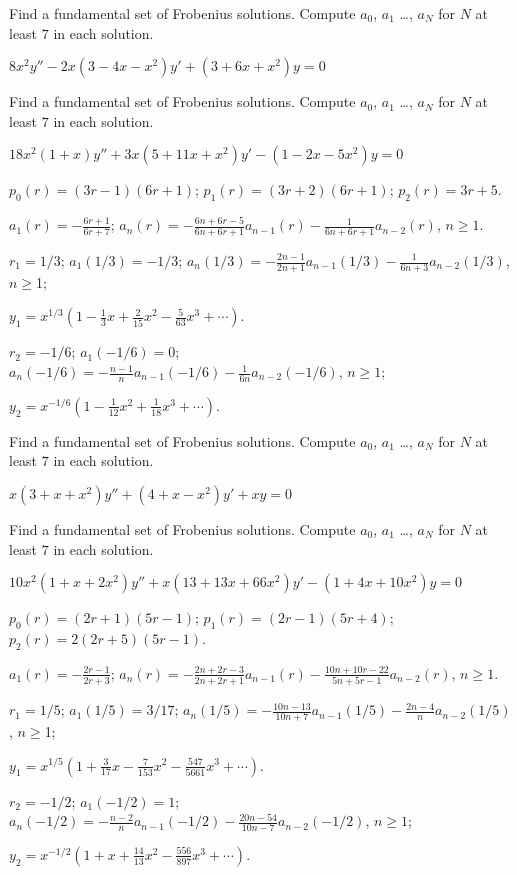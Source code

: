 \documentclass{ximera}
\begin{document}
\begin{problem}\label{exer:7.5.7} 
Find a fundamental
set
of Frobenius solutions. Compute $a_0$, $a_{1}$ \dots, $a_N$ for $N$ at
least
$7$ in
each solution.

$8x^2y''-2x(3-4x-x^2)y'+(3+6x+x^2)y=0$

\end{problem}

\begin{problem}\label{exer:7.5.8} 
Find a fundamental
set
of Frobenius solutions. Compute $a_0$, $a_{1}$ \dots, $a_N$ for $N$ at
least
$7$ in
each solution.

$18x^2(1+x)y''+3x(5+11x+x^2)y'-(1-2x-5x^2)y=0$

\begin{solution}
    $p_0(r)=(3r-1)(6r+1)$;
$p_1(r)=(3r+2)(6r+1)$;
$p_2(r)=3r+5$.

$a_1(r)=-\frac{6r+1}{6r+7}$;
$a_n(r)=-\frac{6n+6r-5}{6n+6r+1}a_{n-1}(r)-\frac{1}{6n+6r+1}a_{n-2}(r)$,
$n\geq 1$.

$r_1=1/3$;
$a_1(1/3)=-1/3$;
$a_n(1/3)=-\frac{2n-1}{2n+1}a_{n-1}(1/3)-\frac{1}{6n+3}a_{n-2}(1/3)$,
$n\geq $1;

$y_1=x^{1/3}\left(1-\frac{1}{3}x+\frac{2}{15}x^2-
\frac{5}{63}x^3+\cdots\right)$.


$r_2=-1/6$;
$a_1(-1/6)=0$;
$a_n(-1/6)=-\frac{n-1}{ n}a_{n-1}(-1/6)-\frac{1}{6n}a_{n-2}(-1/6)$,
$n\geq 1$;

$y_2=x^{-1/6}\left(1-\frac{1}{12}x^2+\frac{1}{18}x^3+\cdots\right)$.
\end{solution}
\end{problem}

\begin{problem}\label{exer:7.5.9}
Find a fundamental
set
of Frobenius solutions. Compute $a_0$, $a_{1}$ \dots, $a_N$ for $N$ at
least
$7$ in
each solution.

$x(3+x+x^2)y''+(4+x-x^2)y'+xy=0$
\end{problem}

\begin{problem}\label{exer:7.5.10} 
Find a fundamental
set
of Frobenius solutions. Compute $a_0$, $a_{1}$ \dots, $a_N$ for $N$ at
least
$7$ in
each solution.

$10x^2(1+x+2x^2)y''+x(13+13x+66x^2)y'-(1+4x+10x^2)y=0$

\begin{solution}
    $p_0(r)=(2r+1)(5r-1)$;
$p_1(r)=(2r-1)(5r+4)$;
$p_2(r)=2(2r+5)(5r-1)$.

$a_1(r)=-\frac{2r-1}{2r+3}$;
$a_n(r)=-\frac{2n+2r-3}{2n+2r+1}a_{n-1}(r)-
\frac{10n+10r-22}{5n+5r-1}a_{n-2}(r)$,
$n\geq 1$.

$r_1=1/5$;
$a_1(1/5)=3/17$;
$a_n(1/5)=-\frac{10n-13}{10n+7}a_{n-1}(1/5)-\frac{2n-4}{ n}a_{n-2}(1/5)$,
$n\geq $1;


$y_1=x^{1/5}\left(1+\frac{3}{17}x-\frac{7}{153}x^2-
\frac{547}{5661}x^3+\cdots\right)$.

$r_2=-1/2$;
$a_1(-1/2)=1$;
$a_n(-1/2)=-\frac{n-2}{ n}a_{n-1}(-1/2)-\frac{20n-54}{10n-7}a_{n-2}(-1/2)$,
$n\geq 1$;

$y_2=x^{-1/2}\left(1+x+\frac{14}{13}x^2-\frac{556}{897}x^3+\cdots\right)$.
\end{solution}
\end{problem}
\end{document}
